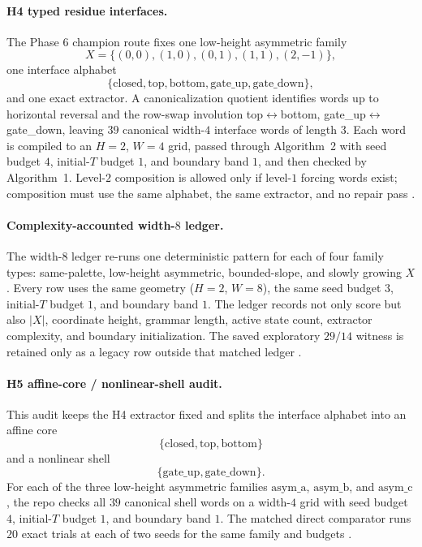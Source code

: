 \documentclass[11pt]{article}
\theoremstyle{definition}
\begin{document}
\paragraph{H4 typed residue interfaces.}
The Phase 6 champion route fixes one low-height asymmetric family
\[
X=\{(0,0),(1,0),(0,1),(1,1),(2,-1)\},
\]
one interface alphabet
\[
\{\mathrm{closed},\mathrm{top},\mathrm{bottom},\mathrm{gate\_up},\mathrm{gate\_down}\},
\]
and one exact extractor. A canonicalization quotient identifies words up to horizontal reversal and the row-swap involution top$\leftrightarrow$bottom, gate\_up$\leftrightarrow$gate\_down, leaving $39$ canonical width-$4$ interface words of length $3$. Each word is compiled to an $H=2$, $W=4$ grid, passed through Algorithm~2 with seed budget $4$, initial-$T$ budget $1$, and boundary band $1$, and then checked by Algorithm~1. Level-$2$ composition is allowed only if level-$1$ forcing words exist; composition must use the same alphabet, the same extractor, and no repair pass \citep{archivara_h4_typed_interfaces}.

\paragraph{Complexity-accounted width-$8$ ledger.}
The width-$8$ ledger re-runs one deterministic pattern for each of four family types: same-palette, low-height asymmetric, bounded-slope, and slowly growing $X$. Every row uses the same geometry ($H=2$, $W=8$), the same seed budget $3$, initial-$T$ budget $1$, and boundary band $1$. The ledger records not only score but also $|X|$, coordinate height, grammar length, active state count, extractor complexity, and boundary initialization. The saved exploratory $29/14$ witness is retained only as a legacy row outside that matched ledger \citep{archivara_complexity_frontier}.

\paragraph{H5 affine-core / nonlinear-shell audit.}
This audit keeps the H4 extractor fixed and splits the interface alphabet into an affine core
\[
\{\mathrm{closed},\mathrm{top},\mathrm{bottom}\}
\]
and a nonlinear shell
\[
\{\mathrm{gate\_up},\mathrm{gate\_down}\}.
\]
For each of the three low-height asymmetric families $\mathrm{asym\_a}$, $\mathrm{asym\_b}$, and $\mathrm{asym\_c}$, the repo checks all $39$ canonical shell words on a width-$4$ grid with seed budget $4$, initial-$T$ budget $1$, and boundary band $1$. The matched direct comparator runs $20$ exact trials at each of two seeds for the same family and budgets \citep{archivara_h5_affine_shell}.
\end{document}
